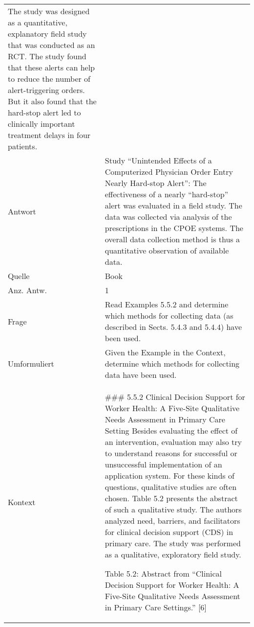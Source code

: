 \begin{landscape}
\begin{longtable}{p{3cm}p{}}
    The study was designed as a quantitative, explanatory field study that was conducted as an RCT.
    The study found that these alerts can help to reduce the number of alert-triggering orders.
    But it also found that the hard-stop alert led to clinically important treatment delays in four patients.\\
    Antwort & Study ``Unintended Effects of a Computerized Physician Order Entry Nearly Hard-stop Alert'': The effectiveness of a nearly ``hard-stop'' alert was evaluated in a field study.
    The data was collected via analysis of the prescriptions in the CPOE systems.
    The overall data collection method is thus a quantitative observation of available data.\\
    Quelle & Book \\
    Anz. Antw. & 1 \\
    \midrule
    Frage & Read Examples 5.5.2 and determine which methods for collecting data (as described in Sects. 5.4.3 and 5.4.4) have been used.\\
    Umformuliert & Given the Example in the Context, determine which methods for collecting data have been used.\\
    Kontext & \#\#\# 5.5.2 Clinical Decision Support for Worker Health: A Five-Site Qualitative Needs Assessment in Primary Care Setting
    Besides evaluating the effect of an intervention, evaluation may also try to understand reasons for successful or unsuccessful implementation of an application system.
    For these kinds of questions, qualitative studies are often chosen.
    Table 5.2 presents the abstract of such a qualitative study.
    The authors analyzed need, barriers, and facilitators for clinical decision support (CDS) in primary care.
    The study was performed as a qualitative, exploratory field study.

    Table 5.2: Abstract from ``Clinical Decision Support for Worker Health: A Five-Site Qualitative Needs Assessment in Primary Care Settings.'' [6]


\end{longtable}
\end{landscape}
